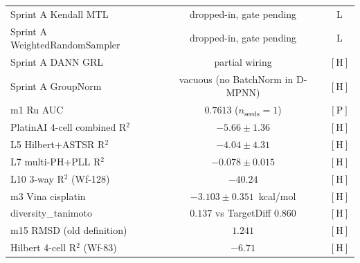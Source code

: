 \begin{table}[ht]
\begin{tabular}{lcc}
Sprint A Kendall MTL            & dropped-in, gate pending            & L    \\
Sprint A WeightedRandomSampler  & dropped-in, gate pending            & L    \\
Sprint A DANN GRL               & partial wiring                      & $[\text{H}]$ \\
Sprint A GroupNorm              & vacuous (no BatchNorm in D-MPNN)    & $[\text{H}]$ \\
m1 Ru AUC                       & $0.7613$ ($n_{\text{seeds}}=1$)     & $[\text{P}]$ \\
PlatinAI 4-cell combined R$^2$  & $-5.66 \pm 1.36$                    & $[\text{H}]$ \\
L5 Hilbert+ASTSR R$^2$          & $-4.04 \pm 4.31$                    & $[\text{H}]$ \\
L7 multi-PH+PLL R$^2$           & $-0.078 \pm 0.015$                  & $[\text{H}]$ \\
L10 3-way R$^2$ (Wf-128)        & $-40.24$                           & $[\text{H}]$ \\
m3 Vina cisplatin               & $-3.103 \pm 0.351$~kcal/mol         & $[\text{H}]$ \\
diversity\_tanimoto             & $0.137$ vs TargetDiff $0.860$       & $[\text{H}]$ \\
m15 RMSD (old definition)       & $1.241$                             & $[\text{H}]$ \\
Hilbert 4-cell R$^2$ (Wf-83)    & $-6.71$                             & $[\text{H}]$ \\
\hline
\end{tabular}
\end{table}